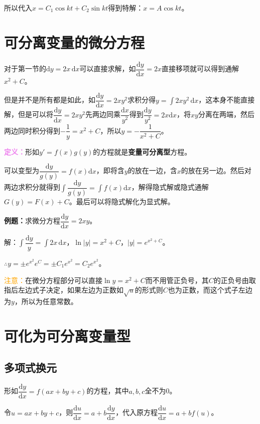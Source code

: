 \documentclass[UTF8, 12pt]{ctexart}
\begin{document}
        所以代入$x=C_1\cos kt+C_2\sin kt$得到特解：$x=A\cos kt$。

        \section{可分离变量的微分方程}

        对于第一节的$\textrm{d}y=2x\,\textrm{d}x$可以直接求解，如$\dfrac{\textrm{d}y}{\textrm{d}x}=2x$直接移项就可以得到通解$x^2+C$。

        但是并不是所有都是如此，如$\dfrac{\textrm{d}y}{\textrm{d}x}=2xy^2$求积分得$y=\int2xy^2\,\textrm{d}x$，这本身不能直接解，但是可以将$\dfrac{\textrm{d}y}{\textrm{d}x}=2xy^2$先两边同乘$\dfrac{\textrm{d}x}{y^2}$得到$\dfrac{\textrm{d}y}{y^2}=2x\textrm{d}x$，将$xy$分离在两端，然后两边同时积分得到$-\dfrac{1}{y}=x^2+C$，所以$y=-\dfrac{1}{x^2+C}$。

        \textcolor{violet}{\textbf{定义：}}形如$y'=f(x)g(y)$的方程就是\textbf{变量可分离型}方程。

        可以变型为$\dfrac{\textrm{d}y}{g(y)}=f(x)\textrm{d}x$，即将含$y$的放在一边，含$x$的放在另一边。然后对两边求积分就得到$\displaystyle{\int\dfrac{\textrm{d}y}{g(y)}=\int f(x)\textrm{d}x}$，解得隐式解或隐式通解$G(y)=F(x)+C$。最后可以将隐式解化为显式解。

        \textbf{例题：}求微分方程$\dfrac{\textrm{d}y}{\textrm{d}x}=2xy$。

        解：$\displaystyle{\int\dfrac{\textrm{d}y}{y}}=\int2x\,\textrm{d}x$，$\ln\vert y\vert=x^2+C$，$\vert y\vert=e^{x^2+C}$。

        $\therefore y=\pm e^{x^2}e^C=\pm C_1e^{x^2}=C_2e^{x^2}$。

        \textcolor{orange}{注意：}在微分方程部分可以直接$\ln y=x^2+C$而不用管正负号，其$C$的正负号由取指后左边式子决定，如果左边为正数如$\sqrt{u}$的形式则$C$也为正数，而这个式子左边为$y$，所以为任意常数。

        \section{可化为可分离变量型}

        \subsection{多项式换元}

        形如$\dfrac{\textrm{d}y}{\textrm{d}x}=f(ax+by+c)$的方程，其中$a,b,c$全不为0。

        令$u=ax+by+c$，则$\dfrac{\textrm{d}u}{\text{d}x}=a+b\dfrac{\textrm{d}y}{\textrm{d}x}$，代入原方程$\dfrac{\textrm{d}u}{\textrm{d}x}=a+bf(u)$。
\end{document}
